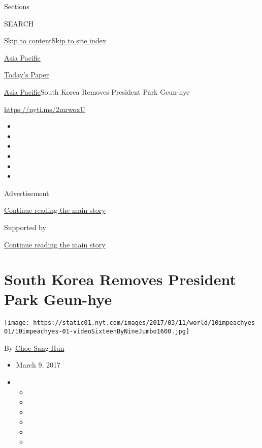 Sections

SEARCH

\protect\hyperlink{site-content}{Skip to
content}\protect\hyperlink{site-index}{Skip to site index}

\href{https://www.nytimes.com/section/world/asia}{Asia Pacific}

\href{https://myaccount.nytimes.com/auth/login?response_type=cookie\&client_id=vi}{}

\href{https://www.nytimes.com/section/todayspaper}{Today's Paper}

\href{/section/world/asia}{Asia Pacific}\textbar{}South Korea Removes
President Park Geun-hye

\url{https://nyti.ms/2mrwoxU}

\begin{itemize}
\item
\item
\item
\item
\item
\item
\end{itemize}

Advertisement

\protect\hyperlink{after-top}{Continue reading the main story}

Supported by

\protect\hyperlink{after-sponsor}{Continue reading the main story}

\hypertarget{south-korea-removes-president-park-geun-hye}{%
\section{South Korea Removes President Park
Geun-hye}\label{south-korea-removes-president-park-geun-hye}}

\texttt{[image: https://static01.nyt.com/images/2017/03/11/world/10impeachyes-01/10impeachyes-01-videoSixteenByNineJumbo1600.jpg]}

By \href{http://www.nytimes.com/by/choe-sang-hun}{Choe Sang-Hun}

\begin{itemize}
\item
  March 9, 2017
\item
  \begin{itemize}
  \item
  \item
  \item
  \item
  \item
  \item
  \end{itemize}
\end{itemize}

